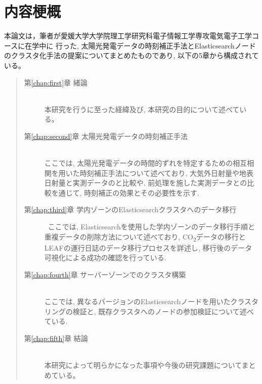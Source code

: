 \chapter*{内容梗概}

本論文は，筆者が愛媛大学大学院理工学研究科電子情報工学専攻電気電子工学コースに在学中に
行った, 太陽光発電データの時刻補正手法とElasticsearchノードのクラスタ化手法の提案についてまとめたものであり, 以下の5章から構成されている。\\

\begin{quote}
      \begin{description}

            \item[第\ref{chap:first}章 緒論]\ \\
            本研究を行うに至った経緯及び, 本研究の目的について述べている。
            \vspace{3.0mm}
            
            \item[第\ref{chap:second}章 太陽光発電データの時刻補正手法]\ \\
            ここでは, 太陽光発電データの時間的ずれを特定するための相互相関を用いた時刻補正手法について述べており, 大気外日射量や地表日射量と実測データのと比較や, 前処理を施した実測データとの比較を通じて, 時刻補正の効果とその必要性を示す. 
            \vspace{3.0mm}
            
            \item[第\ref{chap:third}章 学内ゾーンのElasticsearchクラスタへのデータ移行]\
            ここでは, Elasticsearchを使用した学内ゾーンのデータ移行手順と重複データの削除方法について述べており, CO\textsubscript{2}データの移行とLEAFの運行日誌のデータ移行プロセスを詳述し, 移行後のデータ可視化による成功の確認を行っている.
            \vspace{3.0mm}
            
            \item[第\ref{chap:fourth}章 サーバーゾーンでのクラスタ構築]\ \\
            ここでは, 異なるバージョンのElasticsearchノードを用いたクラスタリングの検証と, 既存クラスタへのノードの参加検証について述べている.
            \vspace{3.0mm}
            
            \item[第\ref{chap:fifth}章 結論]\ \\
            本研究によって明らかになった事項や今後の研究課題についてまとめている。
      \end{description}
\end{quote}
